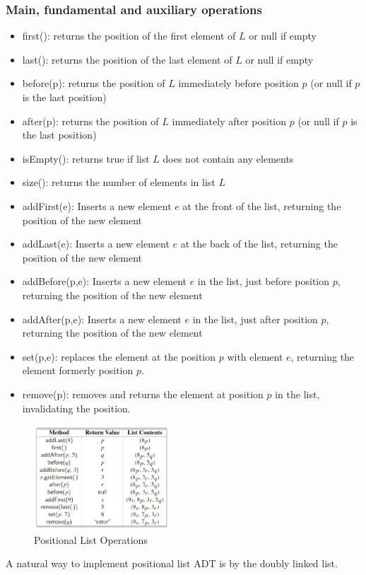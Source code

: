 \documentclass[a4paper]{article}
\theoremstyle{plain}
\theoremstyle{definition}
\theoremstyle{remark}
\begin{document}
\subsubsection{Main, fundamental and auxiliary operations}
\begin{itemize}
	\item first(): returns the position of the first element of $L$ or null if empty
	\item last(): returns the position of the last element of $L$ or null if empty
	\item before(p): returns the position of $L$ immediately before position $p$ (or null if $p$ is the last position)
	\item after(p): returns the position of $L$ immediately after position $p$ (or null if $p$ is the last position)
	\item isEmpty(): returns true if list $L$ does not contain any elements
	\item size(): returns the number of elements in list $L$
	\item addFirst(e): Inserts a new element $e$ at the front of the list, returning the position of the new element
	\item addLast(e): Inserts a new element $e$ at the back of the list, returning the position of the new element
	\item addBefore(p,e): Inserts a new element $e$ in the list, just before position $p $, returning the position of the new element
	\item addAfter(p,e): Inserts a new element $e$ in the list, just after position $p$, returning the position of the new element
	\item set(p,e): replaces the element at the position  $p$ with element $e$, returning the element formerly position $p$.
	\item remove(p): removes and returns the element at position $p$ in the list, invalidating the position.
\end{itemize}
\begin{figure}[H]
	\centering
	\includegraphics[width=0.45\textwidth]{figures/positional.png}
	\caption{Positional List Operations}
	\label{fig:figures-positional-png}
\end{figure}
A natural way to implement positional list ADT is by the doubly linked list.
\end{document}
